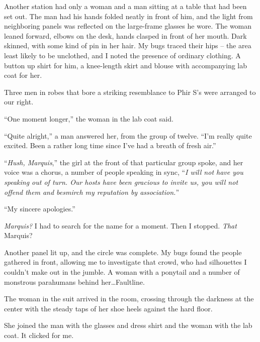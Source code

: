 Another station had only a woman and a man sitting at a table that had been set out.  The man had his hands folded neatly in front of him, and the light from neighboring panels was reflected on the large-frame glasses he wore. The woman leaned forward, elbows on the desk, hands clasped in front of her mouth.  Dark skinned, with some kind of pin in her hair.  My bugs traced their hips – the area least likely to be unclothed, and I noted the presence of ordinary clothing.  A button up shirt for him, a knee-length skirt and blouse with accompanying lab coat for her.



Three men in robes that bore a striking resemblance to Phir S's were arranged to our right.



``One moment longer,'' the woman in the lab coat said.



``Quite alright,'' a man answered her, from the group of twelve.  ``I'm really quite excited.  Been a rather long time since I've had a breath of fresh air.''



``\emph{Hush, Marquis},'' the girl at the front of that particular group spoke, and her voice was a chorus, a number of people speaking in sync, ``\emph{I will not have you speaking out of turn.  Our hosts have been gracious to invite us, you will not offend them and besmirch my reputation by association.}''



``My sincere apologies.''



\emph{Marquis?}  I had to search for the name for a moment.  Then I stopped.  \emph{That} Marquis?



Another panel lit up, and the circle was complete.  My bugs found the people gathered in front, allowing me to investigate that crowd, who had silhouettes I couldn't make out in the jumble.  A woman with a ponytail and a number of monstrous parahumans behind her\ldots  Faultline.



The woman in the suit arrived in the room, crossing through the darkness at the center with the steady taps of her shoe heels against the hard floor.



She joined the man with the glasses and dress shirt and the woman with the lab coat.  It clicked for me.



